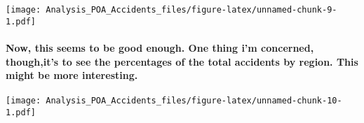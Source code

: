 \documentclass[]{article}
\newenvironment{Shaded}{\begin{snugshade}}{\end{snugshade}}
\newcommand{\KeywordTok}[1]{\textcolor[rgb]{0.13,0.29,0.53}{\textbf{#1}}}
\newcommand{\DataTypeTok}[1]{\textcolor[rgb]{0.13,0.29,0.53}{#1}}
\newcommand{\DecValTok}[1]{\textcolor[rgb]{0.00,0.00,0.81}{#1}}
\newcommand{\StringTok}[1]{\textcolor[rgb]{0.31,0.60,0.02}{#1}}
\newcommand{\OperatorTok}[1]{\textcolor[rgb]{0.81,0.36,0.00}{\textbf{#1}}}
\newcommand{\NormalTok}[1]{#1}
\let\oldparagraph\paragraph
\renewcommand{\paragraph}[1]{\oldparagraph{#1}\mbox{}}
\begin{document}
\begin{Shaded}
\end{Shaded}

\texttt{[image: Analysis\_POA\_Accidents\_files/figure-latex/unnamed-chunk-9-1.pdf]}

\paragraph{Now, this seems to be good enough. One thing i'm concerned,
though,it's to see the percentages of the total accidents by region.
This might be more
interesting.}\label{now-this-seems-to-be-good-enough.-one-thing-im-concerned-thoughits-to-see-the-percentages-of-the-total-accidents-by-region.-this-might-be-more-interesting.}

\begin{Shaded}
\end{Shaded}

\texttt{[image: Analysis\_POA\_Accidents\_files/figure-latex/unnamed-chunk-10-1.pdf]}
\end{document}
